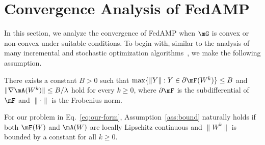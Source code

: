 
\section{Convergence Analysis of FedAMP}\label{sec:analysis}
In this section, we analyze the convergence of FedAMP when $\mG$ is convex or non-convex under suitable conditions. 
To begin with, similar to the analysis of many incremental and stochastic optimization algorithms~\cite{bertsekas2011incremental,nemirovski2009robust}, we make the following assumption.
\begin{assumption}\label{ass:bound}
There exists a constant $B>0$ such that $\max\{ \|Y\|: Y\in \partial \mF(W^k) \} \leq B$ and $\|\nabla \mA(W^k)\|\leq B/\lambda$ hold for every  $k \geq 0$, where $\partial \mF$ is the subdifferential of $\mF$ and $\|\cdot\|$ is the Frobenius norm. 
\end{assumption}

For our problem in Eq.~\eqref{eq:our-form}, Assumption~\ref{ass:bound} naturally holds if both $\mF(W)$ and $\mA(W)$ are locally Lipschitz continuous and $\|W^k\|$ is bounded by a constant for all $k\geq 0$. 


